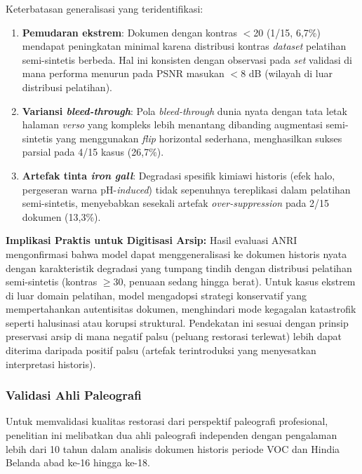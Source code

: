 \documentclass[12pt,a4paper]{article}
\begin{document}
Keterbatasan generalisasi yang teridentifikasi:
\begin{enumerate}[nosep]
    \item \textbf{Pemudaran ekstrem}: Dokumen dengan kontras $<$20 (1/15, 6,7\%) mendapat peningkatan minimal karena distribusi kontras \textit{dataset} pelatihan semi-sintetis berbeda. Hal ini konsisten dengan observasi pada \textit{set} validasi di mana performa menurun pada PSNR masukan $<$8 dB (wilayah di luar distribusi pelatihan).
    
    \item \textbf{Variansi \textit{bleed-through}}: Pola \textit{bleed-through} dunia nyata dengan tata letak halaman \textit{verso} yang kompleks lebih menantang dibanding augmentasi semi-sintetis yang menggunakan \textit{flip} horizontal sederhana, menghasilkan sukses parsial pada 4/15 kasus (26,7\%).
    
    \item \textbf{Artefak tinta \textit{iron gall}}: Degradasi spesifik kimiawi historis (efek halo, pergeseran warna pH-\textit{induced}) tidak sepenuhnya tereplikasi dalam pelatihan semi-sintetis, menyebabkan sesekali artefak \textit{over-suppression} pada 2/15 dokumen (13,3\%).
\end{enumerate}

\textbf{Implikasi Praktis untuk Digitisasi Arsip:} Hasil evaluasi ANRI mengonfirmasi bahwa model dapat menggeneralisasi ke dokumen historis nyata dengan karakteristik degradasi yang tumpang tindih dengan distribusi pelatihan semi-sintetis (kontras $\geq$30, penuaan sedang hingga berat). Untuk kasus ekstrem di luar domain pelatihan, model mengadopsi strategi konservatif yang mempertahankan autentisitas dokumen, menghindari mode kegagalan katastrofik seperti halusinasi atau korupsi struktural. Pendekatan ini sesuai dengan prinsip preservasi arsip di mana negatif palsu (peluang restorasi terlewat) lebih dapat diterima daripada positif palsu (artefak terintroduksi yang menyesatkan interpretasi historis).

\vspace{0.8em}

\subsubsection{Validasi Ahli Paleografi}
\label{subsubsec:anri-validasi-ahli}

Untuk memvalidasi kualitas restorasi dari perspektif paleografi profesional, penelitian ini melibatkan dua ahli paleografi independen dengan pengalaman lebih dari 10 tahun dalam analisis dokumen historis periode VOC dan Hindia Belanda abad ke-16 hingga ke-18.
\end{document}
